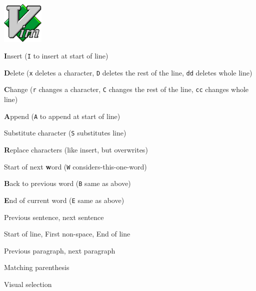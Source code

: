 \documentclass[12pt, a4paper]
{article}
\begin{document}
\pagestyle{empty}

\begin{center}
	 \hspace{1em}  \includegraphics[height=2cm]{Vim_logo}
	\vspace*{0.5em}
\end{center}

\begin{multicols}{3}
	
\begin{description}[nolistsep]
	\item[i] \textbf{I}nsert (\texttt{I} to insert at start of line)
	\item[d] \textbf{D}elete (\texttt{x} deletes a character, \texttt{D} deletes the rest of the line, \texttt{dd} deletes whole line)
	\item[c] \textbf{C}hange (\texttt{r} changes a character, \texttt{C} changes the rest of the line, \texttt{cc} changes whole line)
	\item[a] \textbf{A}ppend (\texttt{A} to append at start of line)
	\item[s] Substitute character (\texttt{S} substitutes line)
	\item[R] \textbf{R}eplace characters (like insert, but overwrites)
\end{description}


\begin{description}[nolistsep]
	\item[w] Start of next \textbf{w}ord (\texttt{W} considers-this-one-word)
	\item[b] \textbf{B}ack to previous word (\texttt{B} same as above)
	\item[e] \textbf{E}nd of current word (\texttt{E} same as above)
	\item[( )] Previous sentence, next sentence
	\item[0 \textasciicircum \ \$] Start of line, First non-space, End of line
	\item[\{ \}] Previous paragraph, next paragraph
	\item[\%] Matching parenthesis
	\item[v] Visual selection
\end{description}


\end{multicols}
\end{document}
